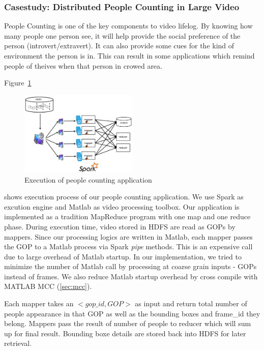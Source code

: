 \subsubsection{Casestudy: Distributed People Counting in Large Video}
People Counting is one of the key components to video lifelog. By knowing how
many people one person see, it will help provide the social preference of the
person (introvert/extravert). It can also provide some cues for the kind of
environment the person is in. This can result in some applications which remind
people of theives when that person in crowed area.

Figure~\ref{fig:overview}\begin{figure}[htbp!]\centering
\vspace{-1ex}
\includegraphics[width=0.5\textwidth]{figures/overview.pdf}
\vspace{-4ex}
\caption{Execution of people counting application}
\label{fig:overview}
\end{figure} shows execution process of our people counting
application. We use Spark as excution engine and Matlab as video processing
toolbox. Our application is implemented as a tradition MapReduce program with
one map and one reduce phase. During execution time, video stored in HDFS are read as GOPs by mappers. Since our processing logics are written in Matlab,
each mapper passes the GOP to a Matlab process via Spark \textit{pipe} methods.
This is an expensive call due to large overhead of Matlab startup. In our
implementation, we tried to minimize the number of Matlab call by processing at
coarse grain inputs - GOPs instead of frames. We also reduce Matlab startup
overhead by cross compile with MATLAB MCC (\textsection\ref{sec:mcc}).

Each mapper takes an $<gop\_id, GOP>$ as input and return total number of people
appearance in that GOP as well as the bounding boxes and frame\_id they belong.
Mappers pass the result of number of people to reducer which will sum up for
final result. Bounding boxe details are stored back into HDFS for later
retrieval.

